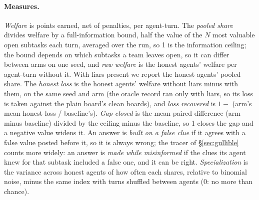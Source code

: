 \documentclass{article}
\begin{document}
\paragraph{Measures.} \emph{Welfare} is points earned, net of penalties, per agent-turn. The \emph{pooled share} divides welfare by a full-information bound, half the value of the $N$ most valuable open subtasks each turn, averaged over the run, so 1 is the information ceiling; the bound depends on which subtasks a team leaves open, so it can differ between arms on one seed, and \emph{raw welfare} is the honest agents' welfare per agent-turn without it. With liars present we report the honest agents' pooled share. The \emph{honest loss} is the honest agents' welfare without liars minus with them, on the same seed and arm (the oracle record ran only with liars, so its loss is taken against the plain board's clean boards), and \emph{loss recovered} is $1 -$ (arm's mean honest loss / baseline's). \emph{Gap closed} is the mean paired difference (arm minus baseline) divided by the ceiling minus the baseline, so 1 closes the gap and a negative value widens it. An answer is \emph{built on a false clue} if it agrees with a false value posted before it, so it is always wrong; the tracer of \S\ref{sec:gullible} counts more widely: an answer is \emph{made while misinformed} if the clues its agent knew for that subtask included a false one, and it can be right. \emph{Specialization} is the variance across honest agents of how often each shares, relative to binomial noise, minus the same index with turns shuffled between agents (0: no more than chance).
\end{document}
